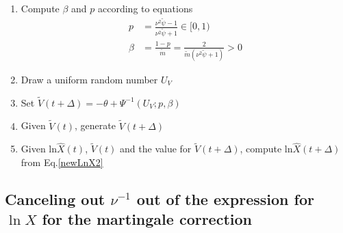 \documentclass{ws-ijfe}
\begin{document}
\begin{enumerate}
\begin{enumerate}
  \item Compute $\beta$ and $p$ according to equations
  \begin{align*}
    p & =\frac{\nu^2\tilde{\psi}-1}{\nu^2\tilde{\psi}+1}\in[0,1) \\
    \beta & =\frac{1-p}{\tilde{m}}=\frac{2}{\tilde{m}(\nu^2\tilde{\psi}+1)}>0
  \end{align*}
  \item Draw a uniform random number $U_V$
  \item Set $\tilde{V}(t+\Delta)=-\theta+\Psi^{-1}(U_V;p,\beta)$
  \item Given $\tilde{V}(t)$, generate $\tilde{V}(t+\Delta)$
  \item Given ln$\hat{X}(t)$, $\tilde{V}(t)$ and the value for $\tilde{V}(t+\Delta)$, compute ln$\hat{X}(t+\Delta)$ from Eq.\eqref{newLnX2}
\end{enumerate}
\end{enumerate}

\subsection{Canceling out $\nu^{-1}$ out of the expression for $\ln X$ for the martingale correction}
\end{document}
